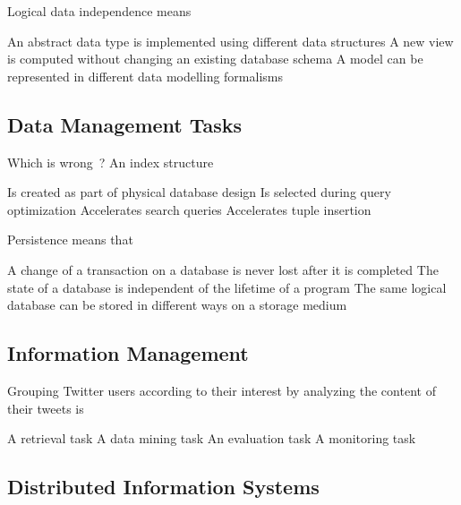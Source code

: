 \documentclass[12pt,a4paper,answers]{exam} %
\begin{document}
\begin{flushleft}
\begin{multicols*}{2}
\begin{questions}
\question Logical data independence means
\begin{checkboxes}
\choice An abstract data type is implemented using different data structures
\choice A new view is computed without changing an existing database schema
\choice A model can be represented in different data modelling formalisms
\end{checkboxes}

\subsection{Data Management Tasks}

\question Which is wrong~? An index structure
\begin{checkboxes}
\choice Is created as part of physical database design
\choice Is selected during query optimization
\choice Accelerates search queries
\choice Accelerates tuple insertion
\end{checkboxes}

\question Persistence means that
\begin{checkboxes}
\choice A change of a transaction on a database is never lost after it is completed
\choice The state of a database is independent of the lifetime of a program
\choice The same logical database can be stored in different ways on a storage medium
\end{checkboxes}

\subsection{Information Management}

\question Grouping Twitter users according to their interest by analyzing the content of their tweets is
\begin{checkboxes}
\choice A retrieval task
\choice A data mining task
\choice An evaluation task
\choice A monitoring task
\end{checkboxes}

\subsection{Distributed Information Systems}


\end{questions}
\end{multicols*}
\end{flushleft}
\end{document}
